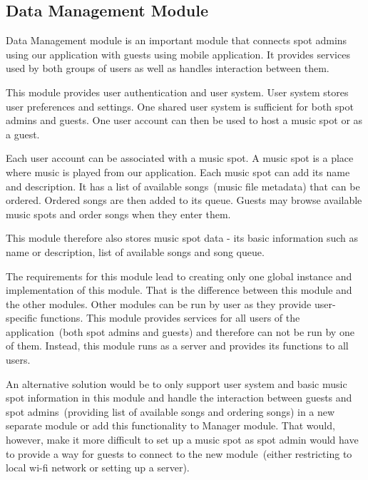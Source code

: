 \subsection{Data Management Module}

Data Management module is an important module that connects spot admins using our application with guests using mobile application. It provides services used by both groups of users as well as handles interaction between them.
\par
This module provides user authentication and user system. User system stores user preferences and settings. One shared user system is sufficient for both spot admins and guests. One user account can then be used to host a music spot or as a guest.
\par
Each user account can be associated with a music spot. A music spot is a place where music is played from our application. Each music spot can add its name and description. It has a list of available songs~(music file metadata) that can be ordered. Ordered songs are then added to its queue. Guests may browse available music spots and order songs when they enter them.
\par
This module therefore also stores music spot data - its basic information such as name or description, list of available songs and song queue.
\par
The requirements for this module lead to creating only one global instance and implementation of this module. That is the difference between this module and the other modules. Other modules can be run by user as they provide user-specific functions. This module provides services for all users of the application~(both spot admins and guests) and therefore can not be run by one of them. Instead, this module runs as a server and provides its functions to all users.
\par
An alternative solution would be to only support user system and basic music spot information in this module and handle the interaction between guests and spot admins~(providing list of available songs and ordering songs) in a new separate module or add this functionality to Manager module. That would, however, make it more difficult to set up a music spot as spot admin would have to provide a way for guests to connect to the new module~(either restricting to local wi-fi network or setting up a server).
